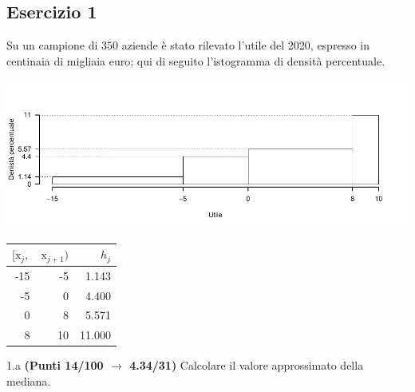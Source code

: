\documentclass[
  11pt,
]{book}
\theoremstyle{mytheoremstyle}
\theoremstyle{mydefstyle}
\begin{document}
\subsection{Esercizio 1}\label{esercizio-1-3}

Su un campione di \(350\) aziende è stato rilevato l'utile del 2020, espresso in centinaia di migliaia euro;
qui di seguito l'istogramma di densità percentuale.

\begin{center}\includegraphics{Esami_passati_con_soluzioni_files/figure-latex/2021-41-1} \end{center}

\begin{table}[H]
\centering
\begin{tabular}{rrr}
\toprule
$[\text{x}_j,$ & $\text{x}_{j+1})$ & $h_j$\\
\midrule
-15 & -5 & 1.143\\
-5 & 0 & 4.400\\
0 & 8 & 5.571\\
8 & 10 & 11.000\\
\bottomrule
\end{tabular}
\end{table}

1.a \textbf{(Punti 14/100 \(\rightarrow\) 4.34/31)} Calcolare il valore approssimato della mediana.
\end{document}
